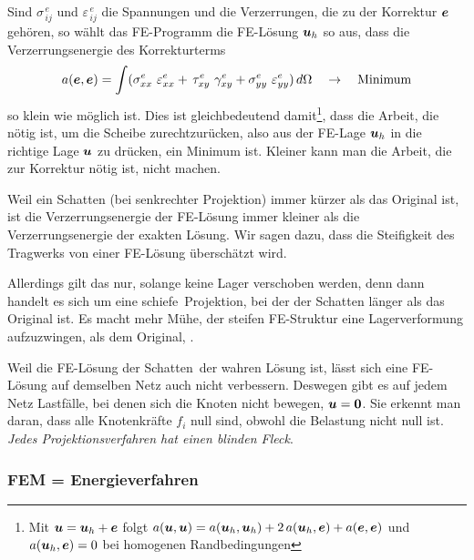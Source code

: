 Sind $\sigma_{\,ij}^{\,e}$ und $\varepsilon_{\,ij}^{\,e}$ die Spannungen und die Verzerrungen, die zu der Korrektur $\mbox{\boldmath $e$}$ geh\"{o}ren, so w\"{a}hlt das FE-Programm die FE-L\"{o}sung $\mbox{\boldmath $u$}_{h} $ so aus, dass die Verzerrungsenergie des Korrekturterms
\begin{align}
a(\mbox{\boldmath $e$},\mbox{\boldmath $e$}) = \int (\sigma_{xx}^e \, \,\varepsilon_{xx}^e + \,\tau_{xy}^e \,
\,\gamma_{xy}^e + \sigma_{yy}^e \, \,\varepsilon_{yy}^e)\,d\Omega \quad \rightarrow
\quad \mbox{Minimum}
\end{align}
so klein wie m\"{o}glich ist. Dies ist gleichbedeutend damit\footnote{Mit $\mbox{\boldmath $u$} = \mbox{\boldmath $u$}_h + \mbox{\boldmath $e$}$ folgt $a(\mbox{\boldmath $u$} ,\mbox{\boldmath $u$}) = a(\mbox{\boldmath $u$}_h,\mbox{\boldmath $u$}_h) + 2\,a(\mbox{\boldmath $u$}_h,\mbox{\boldmath $e$}) + a(\mbox{\boldmath $e$},\mbox{\boldmath $e$})$ und $a(\mbox{\boldmath $u$}_h,\mbox{\boldmath $e$}) = 0$ bei homogenen Randbedingungen}, dass die Arbeit, die n\"{o}tig ist, um die Scheibe zurechtzur\"{u}cken, also aus der FE-Lage $\mbox{\boldmath $u$}_{h} $ in die richtige Lage $\mbox{\boldmath $u$}$ zu dr\"{u}cken, ein Minimum ist. Kleiner kann man die Arbeit, die zur Korrektur n\"{o}tig ist, nicht machen.

Weil ein Schatten (bei senkrechter Projektion) immer k\"{u}rzer als das Original ist, ist die Verzerrungsenergie der FE-L\"{o}sung immer kleiner als die Verzerrungsenergie der exakten L\"{o}sung. Wir sagen dazu, dass die Steifigkeit des Tragwerks von einer FE-L\"{o}sung \"{u}bersch\"{a}tzt wird.

Allerdings gilt das nur, solange keine Lager verschoben werden, denn dann handelt es sich um eine \glq schiefe\grq\ Projektion, bei der der Schatten l\"{a}nger als das Original ist. Es macht mehr M\"{u}he, der steifen FE-Struktur eine Lagerverformung aufzuzwingen, als dem Original, \cite{Ha8}.

Weil die FE-L\"{o}sung \glq der Schatten\grq\ der wahren L\"{o}sung ist, l\"{a}sst sich eine FE-L\"{o}sung auf demselben Netz auch nicht verbessern. Deswegen gibt es auf jedem Netz Lastf\"{a}lle, bei denen sich die Knoten nicht bewegen, $\mbox{\boldmath $u$} = \mbox{\boldmath $0$}$. Sie erkennt man daran, dass alle Knotenkr\"{a}fte $f_i$ null sind, obwohl die Belastung nicht null ist. {\em Jedes Projektionsverfahren hat einen blinden Fleck\/}.\\

{\textcolor{sectionTitleBlue}{\subsubsection*{FEM = Energieverfahren}}}

